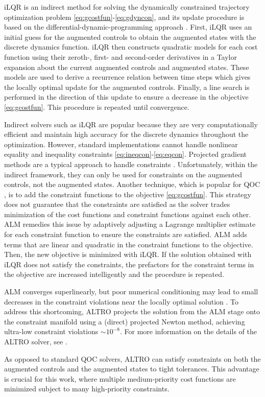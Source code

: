 iLQR is an indirect method
for solving the dynamically constrained
trajectory optimization problem \eqref{eq:gcostfun}-\eqref{eq:gdyncon},
and its update procedure is based on the differential-dynamic-programming approach
\cite{mayne1966a}.
First, iLQR uses an initial guess for the augmented controls to obtain the augmented
states with the discrete dynamics function.
iLQR then constructs quadratic models for each cost function using
their zeroth-, first- and second-order derivatives in a Taylor expansion
about the current augmented controls and augmented states.
These models are used to derive a recurrence relation between time steps
which gives the locally optimal update for the augmented controls.
Finally, a line search \cite{zhang2006global}
is performed in the direction of this update to ensure a
decrease in the objective \eqref{eq:gcostfun}. This procedure
is repeated until convergence.

Indirect solvers such as iLQR are popular
because they are very computationally efficient and maintain
high accuracy for the discrete dynamics throughout the optimization.
However, standard implementations cannot handle
nonlinear equality and inequality
constraints \eqref{eq:ineqcon}-\eqref{eq:eqcon}.
Projected gradient methods are a typical approach
to handle constraints
\cite{clarkson2010coresets, hauswirth2016projected, morzhin2019minimal,
  nikolskii2007convergence}. Unfortunately, within the indirect framework,
they can only be used for constraints on the augmented controls,
not the augmented states.
Another technique, which is popular for QOC \cite{heeres2017implementing, leung2017speedup,
reinhold2019controlling},
is to add the constraint functions to the objective
\eqref{eq:gcostfun}. 
This strategy does not guarantee that the constraints
are satisfied as the solver trades
minimization of the cost functions and constraint functions against each other.
ALM remedies this issue by adaptively adjusting a Lagrange multiplier estimate
for each constraint function to ensure the constraints are satisfied.
ALM adds terms that are linear and quadratic in the constraint functions
to the objective. Then, the new objective is minimized with
iLQR. If the solution obtained with iLQR does not satisfy the constraints,
the prefactors for the constraint terms in the objective are increased
intelligently and the procedure is repeated.

ALM converges superlinearly, but poor numerical conditioning may lead
to small decreases in the constraint violations near the locally optimal solution
\cite{bertsekas1996constrained}.
To address this shortcoming, ALTRO
projects the solution from the ALM stage onto the constraint manifold using
a (direct) projected Newton method, achieving ultra-low
constraint violations $\sim 10^{-8}$.
For more information on the details of the ALTRO
solver, see \cite{howell2019altro, Jackson2020altroc}.

As opposed to standard QOC solvers, ALTRO
can satisfy constraints
on both the augmented controls and the augmented states to tight tolerances.
This advantage is crucial for this work, where multiple medium-priority cost functions
are minimized subject to many high-priority constraints.
